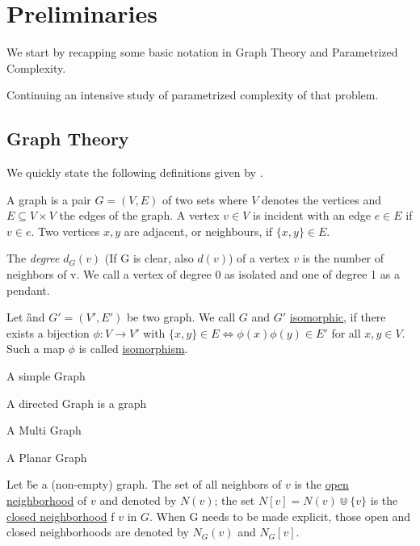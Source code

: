\chapter{Preliminaries}
We start by recapping some basic notation in Graph Theory and Parametrized Complexity. 

Continuing an intensive study of parametrized complexity of that problem. 

\section{Graph Theory}
We quickly state the following definitions given by {\cite[p.~xxx]{diestel10}}.

\begin{definition}
    A graph is a pair $G = (V, E)$ of two sets where $V$ denotes the vertices and $E \subseteq V \times V$ the edges of the graph.  A vertex $v \in V$ is incident with an edge $e \in E$ if $v \in e$. Two vertices $x, y$ are adjacent, or neighbours, if $\{x,y \} \in E$.
\end{definition}

\begin{definition}
    The \textit{degree} $d_G(v)$ (If G is clear, also $d(v)$) of a vertex $v$ is the number of neighbors of v. We call a vertex of degree 0 as isolated and one of degree 1 as a pendant.
\end{definition}

\begin{definition}
Let \G and $G' = (V', E')$ be two graph. We call $G$ and $G'$ \underline{isomorphic}, if there exists a bijection $\phi: V \rightarrow V'$ with $\{x, y\} \in E \Leftrightarrow \phi(x)\phi(y) \in E'$ for all  $x,y \in V$. Such a map $\phi$ is called \underline{isomorphism}.
\end{definition}

\begin{definition}
    A simple Graph
    
    A directed Graph is a graph
    
    A Multi Graph
    
    A Planar Graph
\end{definition}

\begin{definition}
    Let \G be a (non-empty) graph. 
    The set of all neighbors of $v$ is the \underline{open neighborhood} of $v$ and denoted by $N(v)$; the set $N[v] = N(v) \Cup \{v\}$ is the \underline{closed neighborhood} f $v$ in $G$. When G needs to be made explicit, those open and closed neighborhoods are denoted by $N_G(v)$ and $N_G[v]$. 
\end{definition}

